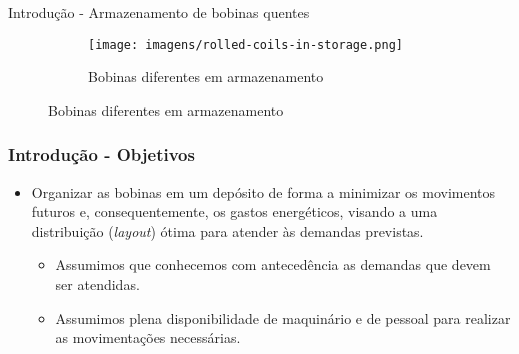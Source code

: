 \begin{frame}{Introdução - Armazenamento de bobinas quentes}
    \begin{figure}
        \begin{figure}
            \centering
            \texttt{[image: imagens/rolled-coils-in-storage.png]}
            \caption{Bobinas diferentes em armazenamento}
            \label{fig:bobinas-armazenamento}
        \end{figure}
    \end{figure}
\end{frame}
\begin{frame}

    \frametitle{Introdução - Objetivos}

    \begin{itemize}
        \item Organizar as bobinas em um depósito de forma a minimizar os movimentos futuros e, consequentemente, os gastos energéticos, visando a uma distribuição (\textit{layout}) ótima para atender às demandas previstas.
        \begin{itemize}
            \item Assumimos que conhecemos com antecedência as demandas que devem ser atendidas.
            \item Assumimos plena disponibilidade de maquinário e de pessoal para realizar as movimentações necessárias.
        \end{itemize}
    \end{itemize}
\end{frame}